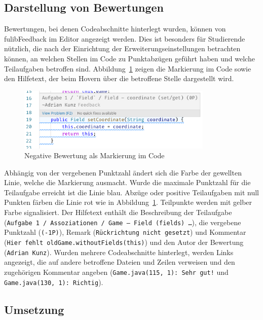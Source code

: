 \subsection{Darstellung von Bewertungen}

Bewertungen, bei denen Codeabschnitte hinterlegt wurden, können von fulibFeedback im Editor angezeigt werden.
Dies ist besonders für Studierende nützlich, die nach der Einrichtung der Erweiterungseinstellungen betrachten können, an welchen Stellen im Code zu Punktabzügen geführt haben und welche Teilaufgaben betroffen sind.
Abbildung~\ref{fig:fulibFeedback-negative} zeigen die Markierung im Code sowie den Hilfetext, der beim Hovern über die betroffene Stelle dargestellt wird.

\begin{figure}
    \centering
    \includegraphics[width=0.83\textwidth]{images/fulibFeedback-positive}
    \caption{Negative Bewertung als Markierung im Code}
    \label{fig:fulibFeedback-negative}
\end{figure}

Abhängig von der vergebenen Punktzahl ändert sich die Farbe der gewellten Linie, welche die Markierung ausmacht.
Wurde die maximale Punktzahl für die Teilaufgabe erreicht ist die Linie blau.
Abzüge oder positive Teilaufgaben mit null Punkten färben die Linie rot wie in Abbildung~\ref{fig:fulibFeedback-negative}.
Teilpunkte werden mit gelber Farbe signalisiert.
Der Hilfetext enthält die Beschreibung der Teilaufgabe (\texttt{Aufgabe 1 / Assoziationen / Game -- Field (fields) \dots}), die vergebene Punktzahl (\texttt{(-1P)}), Remark (\texttt{Rückrichtung nicht gesetzt}) und Kommentar (\texttt{Hier fehlt oldGame.withoutFields(this)}) und den Autor der Bewertung (\texttt{Adrian Kunz}).
Wurden mehrere Codeabschnitte hinterlegt, werden Links angezeigt, die auf andere betroffene Dateien und Zeilen verweisen und den zugehörigen Kommentar angeben (\texttt{Game.java(115, 1): Sehr gut!} und \texttt{Game.java(130, 1): Richtig}).

\subsection{Umsetzung}

